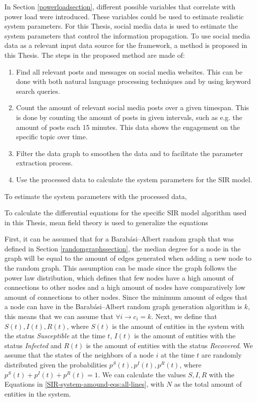 In Section \ref{powerloadsection}, different possible variables that 
correlate with power load were introduced. These variables could be 
used to estimate realistic system parameters. For this Thesis, social media data is 
used to estimate the system parameters that control the 
information propagation.
To use social media data as a relevant input data source for the framework,
a method is proposed in this Thesis. The steps in the proposed method are made of:

\begin{enumerate}
    \item Find all relevant posts and messages on social media websites.
    This can be done with both natural language processing techniques and
    by using keyword search queries.
    \item Count the amount of relevant social media posts over a given 
    timespan. This is done by counting the amount of posts in given intervals, 
    such as e.g. the amount of posts each 15 minutes. This data shows the
    engagement on the specific topic over time.
    \item Filter the data graph to smoothen the data and to facilitate the
    parameter extraction process.
    \item Use the processed data to calculate the system parameters
    for the SIR model.
\end{enumerate}

To estimate the system parameters with the processed data, 




To calculate the differential equations for the specific SIR model algorithm
used in this Thesis, mean field theory 
is used to generalize the equations %


First, it can be assumed that for a Barabási–Albert random graph
that was defined in Section \ref{randomgraphssection}, 
the median degree for a node in the graph will be equal to the amount 
of edges generated when adding a new node to the random graph.
This assumption can be made since the graph follows the power law distribution,
which defines that few nodes have a high amount of connections to other nodes
and a high amount of nodes have comparatively low amount of connections to 
other nodes. Since the minimum amount of edges that a node can have 
in the Barabási–Albert random graph generation algorithm is $k$, this 
means that we can assume that $\forall i \to c_i=k$.
Next, we define that $S(t), I(t), R(t)$, where $S(t)$ is the amount of
entities in the system with the status \textit{Susceptible} at the time $t$, 
$I(t)$ is the amount of entities with the status \textit{Infected} and
$R(t)$ is the amount of entities with the status \textit{Recovered}. 
We assume that the states of the neighbors of a node $i$ at the time $t$ are 
randomly distributed given the probabilities $p^S(t), p^I(t), p^R(t)$,
where $p^S(t) + p^I(t) + p^R(t) = 1$. We can calculate the values $S, I, R$
with the Equations in \ref{SIR-system-amound-eqs:all-lines},
with $N$ as the total amount of entities in the system.

